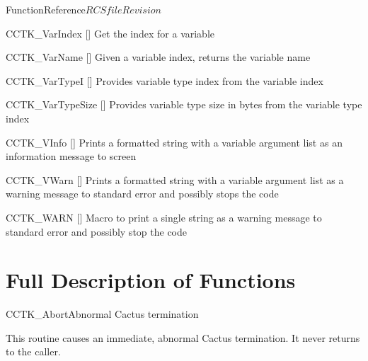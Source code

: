 \begin{cactuspart}{FunctionReference}{$RCSfile$}{$Revision$}
\begin{Lentry}
\item[CCTK\_VarIndex]
   [\pageref{CCTK-VarIndex}]
  Get the index for a variable

\item[CCTK\_VarName]
  [\pageref{CCTK-VarName}]
  Given a variable index, returns the variable name

\item[CCTK\_VarTypeI]
  [\pageref{CCTK-VarTypeI}]
  Provides variable type index from the variable index

\item[CCTK\_VarTypeSize]
  [\pageref{CCTK-VarTypeSize}]
  Provides variable type size in bytes from the variable type index

\item[CCTK\_VInfo]
  [\pageref{CCTK-VInfo}]
  Prints a formatted string with a variable argument list as an information
  message to screen

\item[CCTK\_VWarn]
  [\pageref{CCTK-VWarn}]
  Prints a formatted string with a variable argument list as a warning message
  to standard error and possibly stops the code

\item[CCTK\_WARN]
  [\pageref{CCTK-WARN}]
  Macro to print a single string as a warning message to standard error and
  possibly stop the code

\end{Lentry}


\section{Full Description of Functions}


\begin{CCTKFunc}{CCTK\_Abort}{Abnormal Cactus termination}
\label{CCTK-Abort}
\showargs
\begin{params}
\end{params}
\begin{discussion}
This routine causes an immediate, abnormal Cactus termination.
It never returns to the caller.
\end{discussion}
\end{CCTKFunc}



\end{cactuspart}

